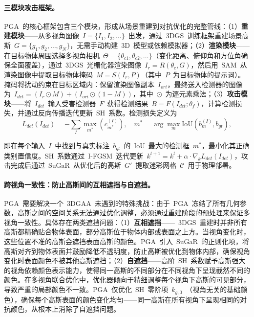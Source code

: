 \paragraph{三模块攻击框架。}
PGA~的核心框架包含三个模块，形成从场景重建到对抗优化的完整管线：（1）\textbf{重建模块}——从多视角图像~$I = \{I_1, I_2, \ldots\}$~出发，通过~3DGS~训练框架重建场景高斯~$G = \{g_1, g_2, \ldots, g_N\}$，无需手动构建~3D~模型或依赖模拟器；（2）\textbf{渲染模块}——在目标物体周围选择多视角相机~$\Theta = \{\theta_{c1}, \theta_{c2}, \ldots\}$（变化距离、俯仰角和方位角确保全面覆盖），通过~3DGS~光栅化器渲染图像~$I_r = R(\theta_c, G)$，然后用~SAM~从渲染图像中提取目标物体掩码~$M = S(I_r, P)$（其中~$P$~为目标物体的提示词）。掩码将扰动约束在目标区域内：保留渲染图像副本~$I_{ori}$，最终送入检测器的图像为~$I_{det} = (I_r \odot M) + (I_{ori} \odot (1 - M))$，其中~$\odot$~为逐元素乘法；（3）\textbf{攻击模块}——将~$I_{det}$~输入受害检测器~$F$~获得检测结果~$B = F(I_{det}; \theta_f)$，计算检测损失，并通过反向传播迭代更新~SH~系数。检测损失定义为
\begin{equation}
    L_{det}(I_{det}) = -\sum_{I} \max_{m^*} \left( c_{m^*}^{(I)} \right), \quad m^* = \arg\max_m \mathrm{IoU}(b_m^{(I)}, b_{gt}),
\end{equation}

即在每个输入~$I$~中找到与真实标注~$b_{gt}$~的~IoU~最大的检测框~$m^*$，最小化其正确类别置信度。SH~系数通过~I-FGSM~迭代更新~$k^{t+1} = k^t + \alpha \cdot \nabla_{k} L_{det}(I_{det})$，攻击完成后通过~SuGaR~从优化后的高斯~$G'$~提取迷彩网格~$\mathcal{C}$~用于物理部署。

\paragraph{跨视角一致性：防止高斯间的互相遮挡与自遮挡。}
PGA~需要解决一个~3DGAA~未遇到的特殊挑战：由于~PGA~冻结了所有几何参数，高斯之间的空间关系无法通过优化调整，必须通过重建阶段的预处理来保证多视角一致性。具体存在两类遮挡问题：（1）\textbf{互相遮挡}——~3DGS~重建时并非所有高斯都精确贴合物体表面，部分高斯位于物体内部或表面之上方。当视角变化时，这些位置不准的高斯会遮挡表面高斯的颜色。PGA~引入~SuGaR~的正则化项，将高斯对齐到物体表面并鼓励降低不透明度，防止高斯被优化到物体内部，确保视角变化时表面颜色不被其他高斯遮挡；（2）\textbf{自遮挡}——高阶~SH~系数赋予高斯强大的视角依赖颜色表示能力，使得同一高斯的不同部分在不同视角下呈现截然不同的颜色。在多视角联合优化中，优化器倾向于精细调整每个视角下高斯的可见部分，导致严重的局部颜色不一致。PGA~仅优化~SH~零阶项~$k_{g,0}$~（视角无关的基础颜色），确保每个高斯表面的颜色变化均匀——同一高斯在所有视角下呈现相同的对抗颜色，从根本上消除了自遮挡问题。


